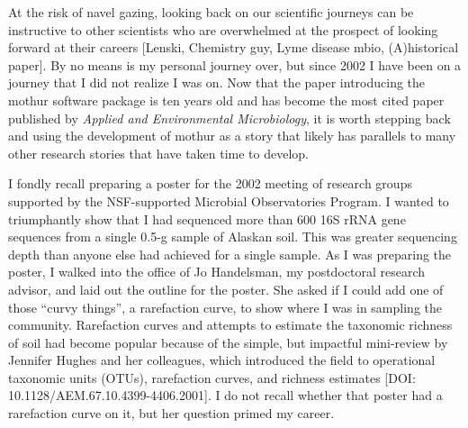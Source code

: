 \documentclass[11pt,]{article}
\begin{document}
At the risk of navel gazing, looking back on our scientific journeys can
be instructive to other scientists who are overwhelmed at the prospect
of looking forward at their careers {[}Lenski, Chemistry guy, Lyme
disease mbio, (A)historical paper{]}. By no means is my personal journey
over, but since 2002 I have been on a journey that I did not realize I
was on. Now that the paper introducing the mothur software package is
ten years old and has become the most cited paper published by
\emph{Applied and Environmental Microbiology}, it is worth stepping back
and using the development of mothur as a story that likely has parallels
to many other research stories that have taken time to develop.

I fondly recall preparing a poster for the 2002 meeting of research
groups supported by the NSF-supported Microbial Observatories Program. I
wanted to triumphantly show that I had sequenced more than 600 16S rRNA
gene sequences from a single 0.5-g sample of Alaskan soil. This was
greater sequencing depth than anyone else had achieved for a single
sample. As I was preparing the poster, I walked into the office of Jo
Handelsman, my postdoctoral research advisor, and laid out the outline
for the poster. She asked if I could add one of those ``curvy things'',
a rarefaction curve, to show where I was in sampling the community.
Rarefaction curves and attempts to estimate the taxonomic richness of
soil had become popular because of the simple, but impactful mini-review
by Jennifer Hughes and her colleagues, which introduced the field to
operational taxonomic units (OTUs), rarefaction curves, and richness
estimates {[}DOI: 10.1128/AEM.67.10.4399-4406.2001{]}. I do not recall
whether that poster had a rarefaction curve on it, but her question
primed my career.
\end{document}
